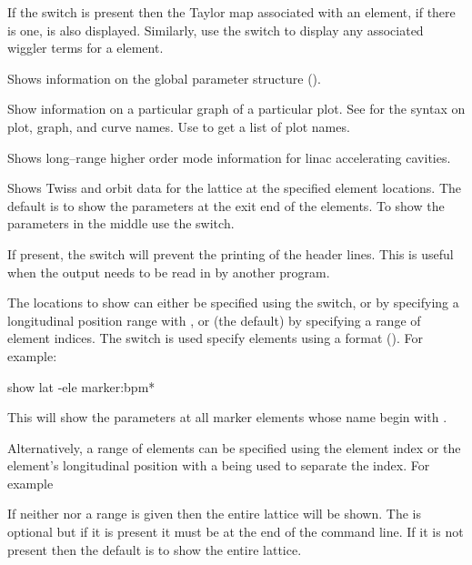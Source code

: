 {\begin{description}
If the  switch is present then the Taylor map associated
with an element, if there is one, is also displayed.  Similarly, use
the  switch to display any associated wiggler terms for
a   element.

  \item[show global]
Shows information on the global parameter structure ().

  \item[show graph]
Show information on a particular graph of a particular plot. See
 for the syntax on plot, graph, and curve names.
Use  to get a list of plot names.

  \item[show hom]
Shows long--range higher order mode information for linac accelerating
cavities.

  \item[show lattice]
Shows Twiss and orbit data for the  lattice at the specified
element locations. The default is to show the parameters at the exit
end of the elements. To show the parameters in the middle use the
 switch.

If present, the  switch will prevent the printing of
the header lines. This is useful when the output needs to be read in
by another program.

The locations to show can either be specified using the 
switch, or by specifying a longitudinal position range with ,
or (the default) by specifying a range of element indices.  The
 switch is used specify elements using a 
format (). For example:
\begin{example}
  show lat -ele marker:bpm*
\end{example}
This will show the parameters at all marker elements whose name begin
with . 

Alternatively, a range of elements can be specified using the element
index or the element's longitudinal position with a  being
used to separate the index. For example
If neither  nor a range is given then the entire lattice
will be shown. The  is optional but if it is present
it must be at the end of the command line.  If it is not present then
the default is to show the entire lattice.


\end{description}}

